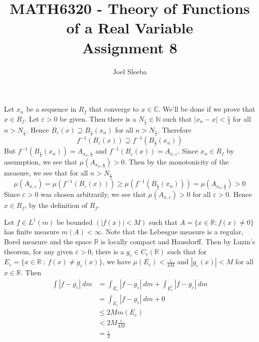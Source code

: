 \documentclass[12pt]{exam}
\theoremstyle{plain} %
\theoremstyle{definition} %
\theoremstyle{remark} %
\begin{document}
\title{MATH6320 - Theory of Functions of a Real Variable \\ Assignment 8}

\author{
  Joel Sleeba \\
}

\maketitle
\printanswers
\unframedsolutions

\begin{questions}

  \question
  \begin{solution}
    Let $x_n$ be a sequence in $R_f$ that converge to $x \in
    \mathbb{C}$. We'll be
    done if we prove that $x \in R_f$. Let $\varepsilon > 0$ be given.
    Then there is a $N_{\frac{\varepsilon}{2}} \in \mathbb{N}$ such that
    $|x_n - x| < \frac{\varepsilon}{2}$ for all $n >
    N_{\frac{\varepsilon}{2}}$. Hence
    $B_\varepsilon(x) \supseteq B_{\frac{\varepsilon}{2}}( x_n)$ for all $n
    > N_{ \frac{\varepsilon}{2}}$. Therefore \[
      f^{-1}(B_\varepsilon(x)) \supseteq f^{-1}(B_{\frac{\varepsilon}{2}}(x_n))
    \]
    But $f^{-1}(B_{\frac{\varepsilon}{2}}(x_n)) = A_{x_n,
    \frac{\varepsilon}{2}}$ and $f^{-1}(B_\varepsilon(x)) = A_{x,
    \varepsilon}$. Since $x_n \in R_f$ by assumption, we see that
    $\mu(A_{x_n , \frac{\varepsilon}{2}}) > 0$. Then by the monotonicity
    of the measure, we see that for all $n > N_{\frac{\varepsilon}{2}}$ \[
      \mu(A_{x, \varepsilon}) = \mu(f^{-1}(B_\varepsilon(x))) \ge
      \mu(f^{-1}(B_{\frac{\varepsilon}{2}}(x_n))) = \mu(A_{x_n,
      \frac{\varepsilon}{2}}) > 0
    \]
    Since $\varepsilon>0$ was chosen arbitrarily, we see that
    $\mu(A_{x, \varepsilon})>0$ for all $\varepsilon>0$. Hence $x \in R_f$,
    by the definition of $R_f$.
  \end{solution}

  \question
  \begin{solution}
    Let $f \in L^1(m)$ be bounded $(|f(x)| < M)$ such that $A = \{ x
    \in \mathbb{R} : f(x) \neq 0 \}$ has finite measure $m(A) <
    \infty$. Note that the Lebesgue measure is a
    regular, Borel measure and the space $\mathbb{R}$ is locally compact and
    Hausdorff. Then by Luzin's theorem, for any given
    $\varepsilon> 0$, there is a $g_\varepsilon \in C_c(\mathbb{R})$ such that
    for $E_\varepsilon = \{ x \in \mathbb{R}  \ : \ f(x) \neq
    g_\varepsilon(x) \}$, we have $\mu(E_\varepsilon) <
    \frac{\varepsilon}{4M}$ and
    $|g_\varepsilon(x)| < M$ for all $x \in \mathbb{R}$. Then
    \begin{align*}
      \int |f - g_\varepsilon| \ d m &= \int_{E_\varepsilon} |f -
      g_\varepsilon| \ d m +
      \int_{E_\varepsilon^c} |f-g_\varepsilon|  \ d m \\
      &= \int_{E_\varepsilon} |f-g_\varepsilon| \ d m + 0 \\
      &\le 2M m(E_\varepsilon) \\
      &< 2M\frac{\varepsilon}{4M} \\
      &= \frac{\varepsilon}{2}
    \end{align*}


\end{solution}
\end{questions}
\end{document}

